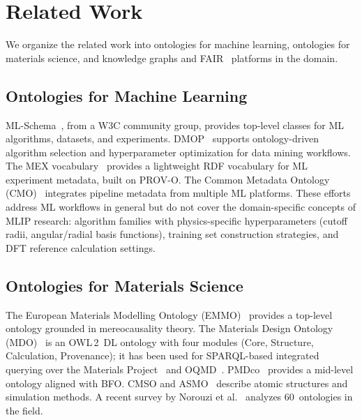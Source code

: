 \section{Related Work}
\label{sec:related-work}

We organize the related work into ontologies for machine learning, ontologies
for materials science, and knowledge graphs and
FAIR~\cite{wilkinson2016fair,Wilkinson2019appendum} platforms in the domain.

\subsection{Ontologies for Machine Learning}

ML-Schema~\cite{publio2018mlschema}, from a W3C community group, provides
top-level classes for ML algorithms, datasets, and experiments.
DMOP~\cite{keet2015dmop} supports ontology-driven algorithm selection and
hyperparameter optimization for data mining workflows. The MEX
vocabulary~\cite{esteves2015mex} provides a lightweight RDF vocabulary for ML
experiment metadata, built on PROV-O. The Common Metadata Ontology
(CMO)~\cite{foltin2024cmo} integrates pipeline metadata from multiple ML
platforms. These efforts address ML workflows in general but do not cover the
domain-specific concepts of MLIP research: algorithm families with
physics-specific hyperparameters (cutoff radii, angular/radial basis functions),
training set construction strategies, and DFT reference calculation settings.

\subsection{Ontologies for Materials Science}

The European Materials Modelling Ontology (EMMO)~\cite{horsch2020emmo} provides
a top-level ontology grounded in mereocausality theory. The Materials Design
Ontology (MDO)~\cite{li2024mdo} is an OWL\,2~DL ontology with four modules
(Core, Structure, Calculation, Provenance); it has been used for
SPARQL-based integrated querying over the Materials
Project~\cite{jain2013mp} and OQMD~\cite{saal2013oqmd}. PMDco~\cite{bayerlein2024pmdco}
provides a mid-level ontology aligned with BFO. CMSO and
ASMO~\cite{menon2024atomrdf} describe atomic structures and simulation methods.
A recent survey by Norouzi et al.~\cite{norouzi2024survey} analyzes
60~ontologies in the field.

